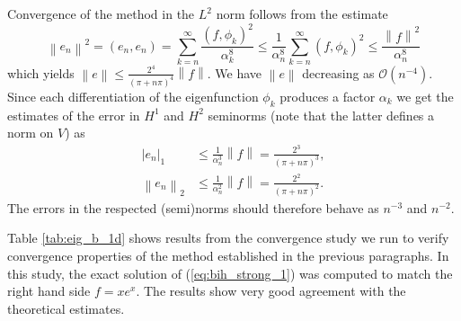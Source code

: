 \documentclass[a4paper,10pt]{article}
\newcommand{\norm}[1]{\ensuremath{\left\|#1\right\|}}
\newcommand{\seminorm}[1]{\ensuremath{\left|#1\right|}}
\newcommand{\inner}[2]{\ensuremath{\left(#1, #2\right)}}
\begin{document}
  Convergence of the method in the $L^2$ norm follows from the estimate
  \[
    \norm{e_n}^2=\inner{e_n}{e_n} = \sum_{k=n}^{\infty}\frac{\inner{f}{\phi_k}^2}{\alpha^8_k} \leq
      \frac{1}{\alpha^8_n}\sum_{k=n}^{\infty} (f, \phi_k)^2 \leq
      \frac{\norm{f}^2}{\alpha^8_n}
  \]
  which yields $\norm{e}\leq\frac{2^4}{\left(\pi + n\pi\right)^4}\norm{f}$.
  We have $\norm{e}$ decreasing as $\mathcal{O}(n^{-4})$. Since each
  differentiation of the eigenfunction  $\phi_k$ produces a factor $\alpha_k$
  we get the estimates of the error in 
  $H^1$ and $H^2$ seminorms (note that the latter defines a norm on $V$) as
  \begin{align*}
    \seminorm{e_n}_1 &\leq \frac{1}{\alpha^3_n}\norm{f} = \frac{2^3}{\left(\pi + n\pi\right)^3}, \\
    \norm{e_n}_2 &\leq \frac{1}{\alpha^2_n}\norm{f} = \frac{2^2}{\left(\pi + n\pi\right)^2}.
  \end{align*}
  The errors in the respected (semi)norms should therefore behave as
  $n^{-3}$ and $n^{-2}$.
    
  Table \ref{tab:eig_b_1d} shows results from the convergence study we run to
  verify convergence properties of the method established in the previous
  paragraphs. In this study, the exact solution of (\ref{eq:bih_strong_1}) was
  computed to match the right hand side $f=x e^x$. The results show very good
  agreement with the theoretical estimates.
\end{document}
